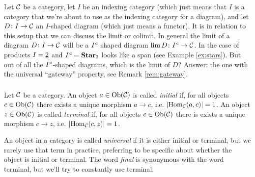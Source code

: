 \documentclass[CT4S-EN-RU]{subfiles}
\begin{document}
\begin{blockENG}
Let $\mathcal{C}$ be a category, let $I$ be an indexing category (which just means that $I$ is a category that we're about to use as the indexing category for a diagram), and let $D\colon I\rightarrow\mathcal{C}$ an $I$-shaped diagram (which just means a functor). It is in relation to this setup that we can discuss the limit or colimit. In general the limit of a diagram $D\colon I\rightarrow\mathcal{C}$ will be a $I^\triangleleft$ shaped diagram $\lim D\colon I^\triangleleft\rightarrow\mathcal{C}$. In the case of products $I=\underline{2}$ and $I^\triangleleft={\mathbf{Star}}_2$ looks like a span (see Example \ref{ex:stars}). But out of all the $I^\triangleleft$-shaped diagrams, which is the limit of $D$? Answer: the one with the universal “gateway” property, see Remark \ref{rem:gateway}.
\end{blockENG}

\begin{blockRUS}
\end{blockRUS}


\subsubsection{}

\begin{definitionENG}
Let $\mathcal{C}$ be a category. An object $a\in\textnormal{Ob}(\mathcal{C})$ is called {\em initial} if, for all objects $c\in\textnormal{Ob}(\mathcal{C})$ there exists a unique morphism $a\to c$, i.e. $|\textnormal{Hom}_\mathcal{C}(a,c)|=1$. An object $z\in\textnormal{Ob}(\mathcal{C})$ is called {\em terminal} if, for all objects $c\in\textnormal{Ob}(\mathcal{C})$ there is exists a unique morphism $c\to z$, i.e. $|\textnormal{Hom}_\mathcal{C}(c,z)|=1$. 
\end{definitionENG}

\begin{definitionRUS}
\end{definitionRUS}

\begin{blockENG}
An object in a category is called {\em universal} if it is either initial or terminal, but we rarely use that term in practice, preferring to be specific about whether the object is initial or terminal. The word {\em final} is synonymous with the word terminal, but we'll try to constantly use terminal. 
\end{blockENG}

\begin{blockRUS}
\end{blockRUS}
\end{document}
